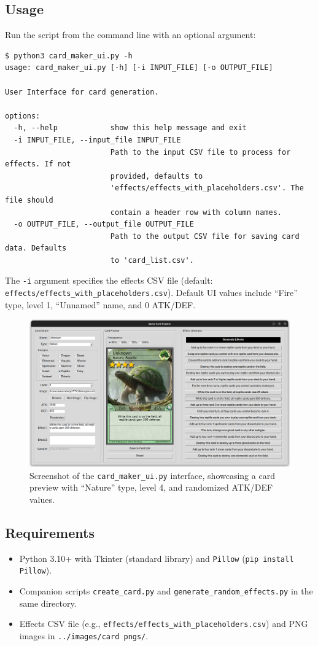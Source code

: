 \subsection{Usage}
Run the script from the command line with an optional argument:
\begin{lstlisting}[style=terminalstyle]
$ python3 card_maker_ui.py -h
usage: card_maker_ui.py [-h] [-i INPUT_FILE] [-o OUTPUT_FILE]

User Interface for card generation.

options:
  -h, --help            show this help message and exit
  -i INPUT_FILE, --input_file INPUT_FILE
                        Path to the input CSV file to process for effects. If not
                        provided, defaults to
                        'effects/effects_with_placeholders.csv'. The file should
                        contain a header row with column names.
  -o OUTPUT_FILE, --output_file OUTPUT_FILE
                        Path to the output CSV file for saving card data. Defaults
                        to 'card_list.csv'.
\end{lstlisting}
The \texttt{-i} argument specifies the effects CSV file (default: \texttt{effects/effects\_with\_placeholders.csv}). Default UI values include ``Fire'' type, level 1, ``Unnamed'' name, and 0 ATK/DEF.

\begin{figure}[h]
	\centering
	\includegraphics[width=\textwidth]{images/ui_sample.png}
	\caption{Screenshot of the \texttt{card\_maker\_ui.py} interface, showcasing a card preview with ``Nature'' type, level 4, and randomized ATK/DEF values.}
	\label{fig:card_maker_ui_screenshot}
\end{figure}

\subsection{Requirements}
\begin{itemize}
	\item Python 3.10+ with Tkinter (standard library) and \texttt{Pillow} (\texttt{pip install Pillow}).
	\item Companion scripts \texttt{create\_card.py} and \texttt{generate\_random\_effects.py} in the same directory.
	\item Effects CSV file (e.g., \texttt{effects/effects\_with\_placeholders.csv}) and PNG images in \texttt{../images/card pngs/}.
\end{itemize}

